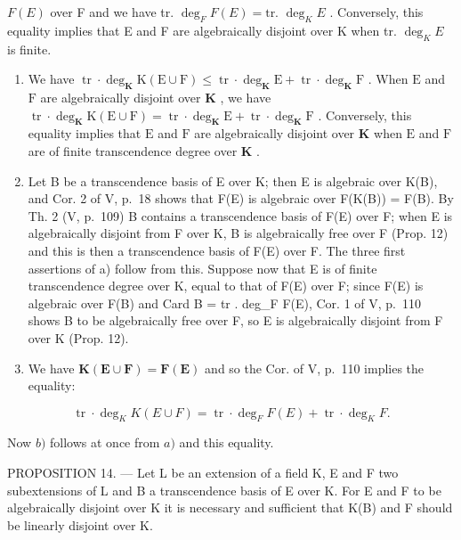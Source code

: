\(F(E)\) over F and we have tr. \(\deg_{F}F(E) = \text{tr. } \deg_{K}E\) . Conversely, this equality implies that E and F are algebraically disjoint over K when tr. \(\deg_{K}E\) is finite.

\begin{enumerate}
\def\labelenumi{\alph{enumi})}
\setcounter{enumi}{1}
\item
  We have \(\operatorname{tr} \cdot \deg_{\mathbf{K}} \mathrm{K}(\mathrm{E} \cup \mathrm{F}) \leqslant \operatorname{tr} \cdot \deg_{\mathbf{K}} \mathrm{E} + \operatorname{tr} \cdot \deg_{\mathbf{K}} \mathrm{F}\) . When \(\mathrm{E}\) and \(\mathrm{F}\) are algebraically disjoint over \(\mathbf{K}\) , we have \(\operatorname{tr} \cdot \deg_{\mathbf{K}} \mathrm{K}(\mathrm{E} \cup \mathrm{F}) = \operatorname{tr} \cdot \deg_{\mathbf{K}} \mathrm{E} + \operatorname{tr} \cdot \deg_{\mathbf{K}} \mathrm{F}\) . Conversely, this equality implies that \(\mathrm{E}\) and \(\mathrm{F}\) are algebraically disjoint over \(\mathbf{K}\) when \(\mathrm{E}\) and \(\mathrm{F}\) are of finite transcendence degree over \(\mathbf{K}\) .
\item
  Let B be a transcendence basis of E over K; then E is algebraic over K(B), and Cor. 2 of V, p.~18 shows that F(E) is algebraic over F(K(B)) = F(B). By Th. 2 (V, p.~109) B contains a transcendence basis of F(E) over F; when E is algebraically disjoint from F over K, B is algebraically free over F (Prop. 12) and this is then a transcendence basis of F(E) over F. The three first assertions of a) follow from this. Suppose now that E is of finite transcendence degree over K, equal to that of F(E) over F; since F(E) is algebraic over F(B) and Card B = tr . deg\_F F(E), Cor. 1 of V, p.~110 shows B to be algebraically free over F, so E is algebraically disjoint from F over K (Prop. 12).
\item
  We have \(\mathbf{K}(\mathbf{E} \cup \mathbf{F}) = \mathbf{F}(\mathbf{E})\) and so the Cor. of V, p.~110 implies the equality:
\end{enumerate}

\[
\operatorname{tr} \cdot \deg_ {K} K (E \cup F) = \operatorname{tr} \cdot \deg_ {F} F (E) + \operatorname{tr} \cdot \deg_ {K} F.
\]

Now \(b)\) follows at once from \(a)\) and this equality.

PROPOSITION 14. --- Let L be an extension of a field K, E and F two subextensions of L and B a transcendence basis of E over K. For E and F to be algebraically disjoint over K it is necessary and sufficient that K(B) and F should be linearly disjoint over K.

